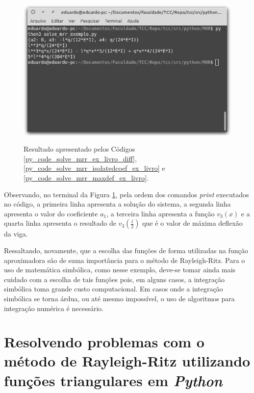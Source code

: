 \documentclass[
	12pt,				%
	openright,			%
    twoside,			%
	a4paper,			%
	chapter=TITLE,		%
	english,			%
	french,				%
	spanish,			%
	brazil				%
	]{abntex2}
\numberwithin{lema}{chapter}
\numberwithin{teorema}{chapter}
\numberwithin{definicao}{chapter}
\numberwithin{exemplo}{chapter}
\numberwithin{figure}{chapter}
\begin{document}
\begin{figure}[h]
	\caption{Resultado apresentado pelos Códigos \ref{py_code_solve_mrr_ex_livro_diff}, \ref{py_code_solve_mrr_isolatedcoef_ex_livro} e \ref{py_code_solve_mrr_maxdef_ex_livro}.}
	\centering
	\includegraphics[scale=2.5]{../figuras/code/code_solve_mrr_exec_complete.png}
	\label{fig:code_solve_mrr_exec_complete}
\end{figure}

Observando, no terminal da Figura \ref{fig:code_solve_mrr_exec_complete}, pela ordem dos comandos \textit{print} executados no código, a primeira linha apresenta a solução do sistema, a segunda linha apresenta o valor do coeficiente $a_1$, a terceira linha apresenta a função $v_3(x)$ e a quarta linha apresenta o resultado de $v_3(\frac{l}{2})$ que é o valor de máxima deflexão da viga.

Ressaltando, novamente, que a escolha das funções de forma utilizadas na função aproximadora são de suma importância para o método de Rayleigh-Ritz. Para o uso de matemática simbólica, como nesse exemplo, deve-se tomar ainda mais cuidado com a escolha de tais funções pois, em alguns casos, a integração simbólica toma grande custo computacional. Em casos onde a integração simbólica se torna árdua, ou até mesmo impossível, o uso de algoritmos para integração numérica é necessário.

\section{Resolvendo problemas com o método de Rayleigh-Ritz utilizando funções triangulares em \textit{Python}}
\label{sec:python_triangular}
\end{document}
